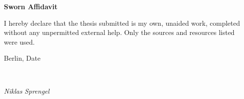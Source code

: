 \newpage

\thispagestyle{empty}

\begin{large}
\vspace*{1.4cm}
\noindent
\begin{center}
{\Large \textbf{Sworn Affidavit}}
\end{center}

\vspace*{0.5cm}

\noindent
I hereby declare that the thesis submitted is my own, unaided work, completed without any unpermitted external
help. Only the sources and resources listed were used.
\vspace{1cm}

\noindent
Berlin, Date

\vspace{3cm}

\hspace*{7cm}%
\dotfill\\
\hspace*{8.5cm}%
\begin{flushright}
\textit{Niklas Sprengel}
\end{flushright}

\end{large}
